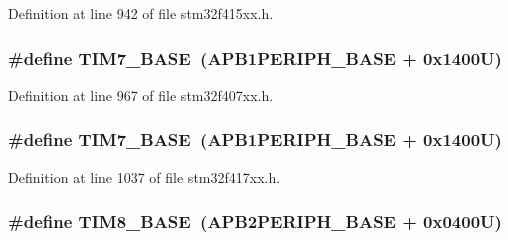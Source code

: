 Definition at line 942 of file stm32f415xx.\+h.

\subsubsection[{\texorpdfstring{T\+I\+M7\+\_\+\+B\+A\+SE}{TIM7_BASE}}]{\setlength{\rightskip}{0pt plus 5cm}\#define T\+I\+M7\+\_\+\+B\+A\+SE~({\bf A\+P\+B1\+P\+E\+R\+I\+P\+H\+\_\+\+B\+A\+SE} + 0x1400\+U)}\hypertarget{group___peripheral__registers__structures_ga0ebf54364c6a2be6eb19ded6b18b6387}{}\label{group___peripheral__registers__structures_ga0ebf54364c6a2be6eb19ded6b18b6387}


Definition at line 967 of file stm32f407xx.\+h.

\subsubsection[{\texorpdfstring{T\+I\+M7\+\_\+\+B\+A\+SE}{TIM7_BASE}}]{\setlength{\rightskip}{0pt plus 5cm}\#define T\+I\+M7\+\_\+\+B\+A\+SE~({\bf A\+P\+B1\+P\+E\+R\+I\+P\+H\+\_\+\+B\+A\+SE} + 0x1400\+U)}\hypertarget{group___peripheral__registers__structures_ga0ebf54364c6a2be6eb19ded6b18b6387}{}\label{group___peripheral__registers__structures_ga0ebf54364c6a2be6eb19ded6b18b6387}


Definition at line 1037 of file stm32f417xx.\+h.

\subsubsection[{\texorpdfstring{T\+I\+M8\+\_\+\+B\+A\+SE}{TIM8_BASE}}]{\setlength{\rightskip}{0pt plus 5cm}\#define T\+I\+M8\+\_\+\+B\+A\+SE~({\bf A\+P\+B2\+P\+E\+R\+I\+P\+H\+\_\+\+B\+A\+SE} + 0x0400\+U)}\hypertarget{group___peripheral__registers__structures_ga5b72f698b7a048a6f9fcfe2efe5bc1db}{}\label{group___peripheral__registers__structures_ga5b72f698b7a048a6f9fcfe2efe5bc1db}


